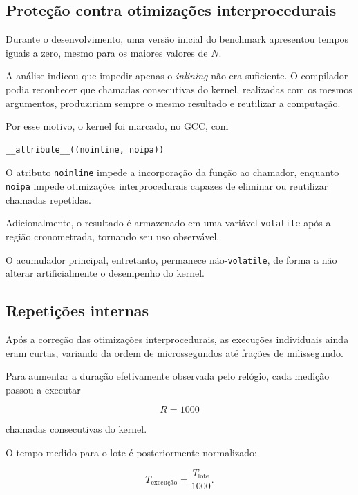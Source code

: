 \subsection{Proteção contra otimizações interprocedurais}

Durante o desenvolvimento, uma versão inicial do benchmark apresentou
tempos iguais a zero, mesmo para os maiores valores de \(N\).

A análise indicou que impedir apenas o \emph{inlining} não era suficiente.
O compilador podia reconhecer que chamadas consecutivas do kernel,
realizadas com os mesmos argumentos, produziriam sempre o mesmo resultado
e reutilizar a computação.

Por esse motivo, o kernel foi marcado, no GCC, com

\begin{verbatim}
__attribute__((noinline, noipa))
\end{verbatim}

O atributo \texttt{noinline} impede a incorporação da função ao chamador,
enquanto \texttt{noipa} impede otimizações interprocedurais capazes de
eliminar ou reutilizar chamadas repetidas.

Adicionalmente, o resultado é armazenado em uma variável
\texttt{volatile} após a região cronometrada, tornando seu uso observável.

O acumulador principal, entretanto, permanece não-\texttt{volatile}, de
forma a não alterar artificialmente o desempenho do kernel.

\subsection{Repetições internas}

Após a correção das otimizações interprocedurais, as execuções individuais
ainda eram curtas, variando da ordem de microssegundos até frações de
milissegundo.

Para aumentar a duração efetivamente observada pelo relógio, cada medição
passou a executar

\begin{equation}
    R=1000
\end{equation}

chamadas consecutivas do kernel.

O tempo medido para o lote é posteriormente normalizado:

\begin{equation}
    T_{\text{execução}}
    =
    \frac{T_{\text{lote}}}{1000}.
\end{equation}

